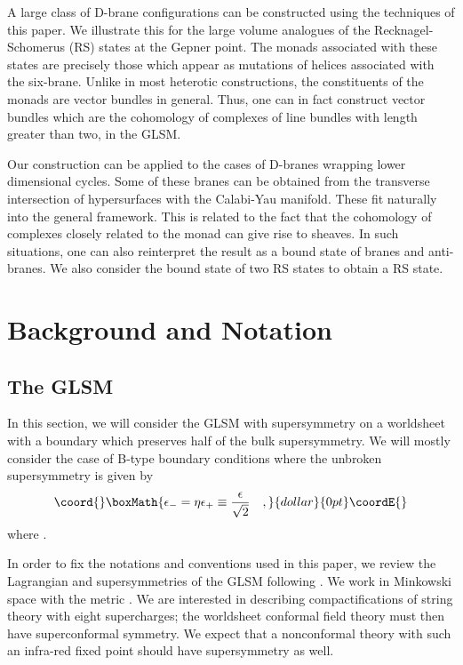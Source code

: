 \documentclass[a4paper,12pt]{article}
\begin{document}
A large class of D-brane configurations can be constructed using the
techniques of this paper. We illustrate this for the large volume
analogues of the \coordHE{}  Recknagel-Schomerus (RS) states\cite{RS} at the
Gepner point. The monads associated with these states are precisely
those which appear as mutations of helices associated with the
six-brane. Unlike in most heterotic constructions, the constituents of the 
monads are vector bundles in general. Thus, one can in fact construct
vector bundles which are the cohomology of complexes of line bundles
with length greater than two, in the GLSM. 


Our construction can be applied to the cases of D-branes wrapping lower
dimensional cycles. Some of these branes can be obtained from the
transverse intersection of hypersurfaces with the Calabi-Yau manifold.
These fit naturally into the general framework. This is related to the
fact that the cohomology of 
complexes closely related to the monad can give rise to
sheaves. In such situations, one can also reinterpret the result as
a bound state of branes and anti-branes\cite{bpsalgebra}. We also
consider the bound state of two \coordHE{}  RS
states to obtain a \coordHE{} RS state.





\section{Background and Notation}
\subsection{The GLSM}

In this section, we will consider the GLSM with \coordHE{} supersymmetry
on a worldsheet with a boundary which preserves half of the bulk
supersymmetry. We will mostly consider the case of B-type boundary
conditions where the unbroken supersymmetry is given by
$$\coord{}\boxMath{
\epsilon_-=\eta\epsilon_+ \equiv {\epsilon\over\sqrt2}\quad,
}{dollar}{0pt}\coordE{}$$
where \coordHE{}.


In order to fix the notations and conventions used in this paper,
we review the Lagrangian and
supersymmetries of the GLSM following \cite{wittenphases}.  We work in
Minkowski space with the metric \myHighlight{$(-,+)$}\coordHE{}.  We are interested in describing
compactifications of string theory with eight supercharges; the worldsheet
conformal field theory must then have \coordHE{} superconformal symmetry. 
We expect that a nonconformal theory with such an infra-red fixed
point should have \coordHE{} supersymmetry as well. 
\end{document}
